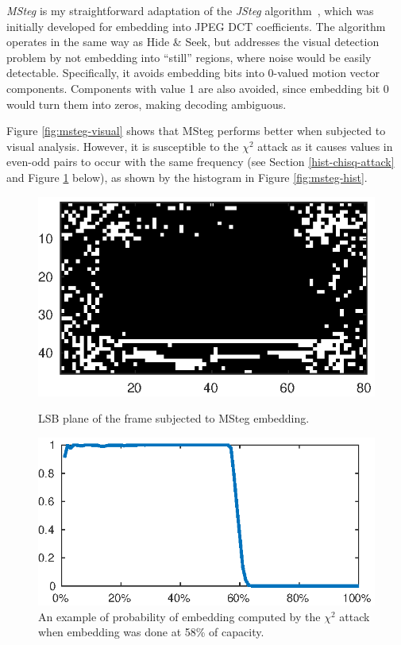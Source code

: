 \documentclass[12pt,british,twoside,notitlepage,usenames,dvipsnames,hypens,final]{report}
\numberwithin{equation}{section}
\numberwithin{figure}{section}
\begin{document}
\emph{MSteg} is my straightforward adaptation of the \emph{JSteg} algorithm~\cite{bateman}, which was initially developed for embedding into JPEG DCT coefficients. The algorithm operates in the same way as Hide \& Seek, but addresses the visual detection problem by not embedding into ``still'' regions, where noise would be easily detectable. Specifically, it avoids embedding bits into 0-valued motion vector components. Components with value 1 are also avoided, since embedding bit 0 would turn them into zeros, making decoding ambiguous.

Figure \ref{fig:msteg-visual} shows that MSteg performs better when subjected to visual analysis. However, it is susceptible to the $\chi^2$ attack as it causes values in even-odd pairs to occur with the same frequency (see Section \ref{hist-chisq-attack} and Figure \ref{fig:chisq-attack} below), as shown by the histogram in Figure \ref{fig:msteg-hist}.

\begin{figure}[tbh]
\centering
\begin{minipage}[t]{.4\textwidth}
  \centering
  \includegraphics[scale=0.8]{img/msteg-visual.eps}
  \caption{LSB plane of the frame subjected to MSteg embedding.}
  \label{fig:msteg-visual}
\end{minipage}
\quad\quad
\begin{minipage}[t]{.45\textwidth}
  \centering
  \includegraphics[scale=0.84]{img/chisq-attack.eps}
  \caption{An example of probability of embedding computed by the $\chi^2$ attack when embedding was done at 58\% of capacity.}
  \label{fig:chisq-attack}
\end{minipage}
\end{figure}
\end{document}
